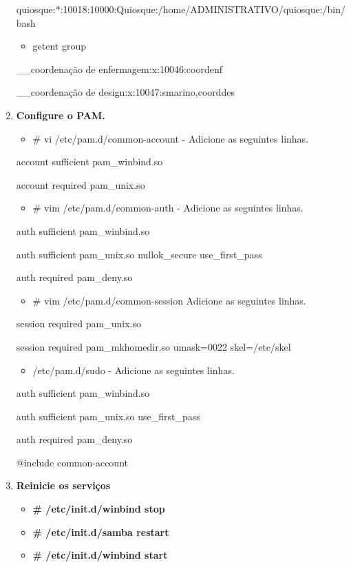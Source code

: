 \begin{enumerate}
		quiosque:*:10018:10000:Quiosque:/home/ADMINISTRATIVO/quiosque:/bin/bash

		\begin{itemize}
			\item {getent group}
		\end{itemize}

		\_\_coordenação de enfermagem:x:10046:coordenf

		\_\_coordenação de design:x:10047:smarino,coorddes

	\item \textbf{Configure o PAM.}
		\begin{itemize}
			\item {\# vi /etc/pam.d/common-account} - Adicione as seguintes linhas.
		\end{itemize}

		account sufficient       pam\_winbind.so

		account required         pam\_unix.so

		\begin{itemize}
			\item {\# vim /etc/pam.d/common-auth} - Adicione as seguintes linhas.
		\end{itemize}

		auth sufficient pam\_winbind.so

		auth sufficient pam\_unix.so nullok\_secure use\_first\_pass

		auth required   pam\_deny.so

		\begin{itemize}
			\item {\# vim /etc/pam.d/common-session} Adicione as seguintes linhas.
		\end{itemize}

		session required pam\_unix.so

		session required pam\_mkhomedir.so umask=0022 skel=/etc/skel

		\begin{itemize}
			\item {/etc/pam.d/sudo} - Adicione as seguintes linhas.
		\end{itemize}

		auth sufficient pam\_winbind.so

		auth sufficient pam\_unix.so use\_first\_pass

		auth required   pam\_deny.so

		$@$include common-account

	\item \textbf{Reinicie os serviços}
		\begin{itemize}
			\item \textbf{\# /etc/init.d/winbind stop}
			\item \textbf{\# /etc/init.d/samba restart}
			\item \textbf{\# /etc/init.d/winbind start}
		\end{itemize}


\end{enumerate}
